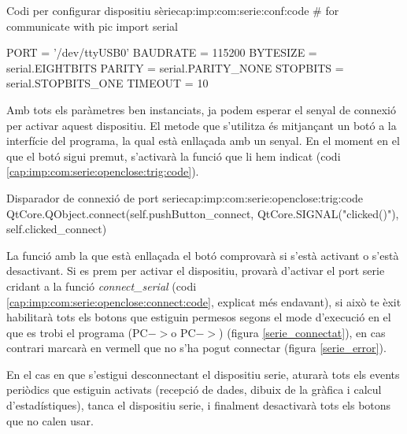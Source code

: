\begin{code_python}{Codi per configurar dispositiu sèrie}{cap:imp:com:serie:conf:code}
# for communicate with pic
import serial

PORT = '/dev/ttyUSB0'
BAUDRATE = 115200
BYTESIZE = serial.EIGHTBITS
PARITY = serial.PARITY_NONE
STOPBITS = serial.STOPBITS_ONE
TIMEOUT = 10
\end{code_python}

Amb tots els paràmetres ben instanciats, ja podem esperar el senyal de connexió per activar aquest dispositiu. El metode que s'utilitza és mitjançant un botó a la interfície del programa, la qual està enllaçada amb un senyal.
En el moment en el que el botó sigui premut, s'activarà la funció que li hem indicat (codi \ref{cap:imp:com:serie:openclose:trig:code}).

\begin{code_python}{Disparador de connexió de port serie}{cap:imp:com:serie:openclose:trig:code}
QtCore.QObject.connect(self.pushButton_connect, QtCore.SIGNAL("clicked()"), self.clicked_connect)
\end{code_python}

La funció amb la que està enllaçada el botó comprovarà si s'està activant o s'està desactivant. Si es prem per activar el dispositiu, provarà d'activar el port serie cridant a la funció \emph{connect\_serial} (codi \ref{cap:imp:com:serie:openclose:connect:code}, explicat més endavant), si això te èxit habilitarà tots els botons que estiguin permesos segons el mode d'execució en el que es trobi el programa (PC$->$\SensorActuador o PC$->$\Monitor) (figura \ref{serie_connectat}), en cas contrari marcarà en vermell que no s'ha pogut connectar (figura \ref{serie_error}).

En el cas en que s'estigui desconnectant el dispositiu serie, aturarà tots els events periòdics que estiguin activats (recepció de dades, dibuix de la gràfica i calcul d'estadístiques), tanca el dispositiu serie, i finalment desactivarà tots els botons que no calen usar.


